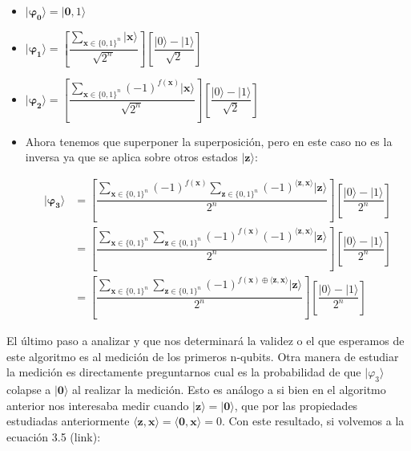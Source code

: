  \begin{itemize}
     \item $\mathbf{|\varphi_{0}\rangle} = |\mathbf{0},1\rangle$

    \vspace{5pt}

    \item  $\mathbf{|\varphi_{1}\rangle} = \left[ \dfrac{\sum_{\mathbf{x} \in \{0,1\}^{n}}|\mathbf{x}\rangle}{\sqrt{2^{n}}}\right] \left[ \dfrac{|0\rangle - |1\rangle}{\sqrt{2}}\right]$

    \vspace{5pt}

    \item $\mathbf{|\varphi_{2}\rangle} =\left[ \dfrac{\sum_{\mathbf{x} \in \{0,1\}^{n}}(-1)^{f(\mathbf{x})}|\mathbf{x}\rangle}{\sqrt{2^{n}}}\right] \left[ \dfrac{|0\rangle - |1\rangle}{\sqrt{2}}\right]$

    \vspace{5pt}

    \item Ahora tenemos que superponer la superposición, pero en este caso no es la inversa ya que se aplica sobre otros estados $|\mathbf{z}\rangle$:

    \begin{equation}
        \begin{split}\mathbf{|\varphi_{3}\rangle} &= \left[ \dfrac{\sum_{\mathbf{x} \in \{0,1\}^{n}}(-1)^{f(\mathbf{x})}\sum_{\mathbf{z} \in \{0,1\}^{n}}(-1)^{\langle\mathbf{z},\mathbf{x}\rangle}|\mathbf{z}\rangle}{2^{n}}\right] \left[ \dfrac{|0\rangle - |1\rangle}{2^{n}}\right] \\ &= \left[ \dfrac{\sum_{\mathbf{x} \in \{0,1\}^{n}}\sum_{\mathbf{z} \in \{0,1\}^{n}}(-1)^{f(\mathbf{x})}(-1)^{\langle\mathbf{z},\mathbf{x}\rangle}|\mathbf{z}\rangle}{2^{n}}\right] \left[ \dfrac{|0\rangle - |1\rangle}{2^{n}}\right] \\ &= \left[ \dfrac{\sum_{\mathbf{x} \in \{0,1\}^{n}}\sum_{\mathbf{z} \in \{0,1\}^{n}}(-1)^{f(\mathbf{x})\oplus\langle\mathbf{z},\mathbf{x}\rangle}|\mathbf{z}\rangle}{2^{n}}\right] \left[ \dfrac{|0\rangle - |1\rangle}{2^{n}}\right]
        \end{split}
    \end{equation}
 \end{itemize}

 El último paso a analizar y que nos determinará la validez o el que esperamos de este algoritmo es al medición de los primeros n-qubits. Otra manera de estudiar la medición es directamente preguntarnos cual es la probabilidad de que $|\varphi_{3}\rangle$ colapse a $|\mathbf{0}\rangle$ al realizar la medición. Esto es análogo a si bien en el algoritmo anterior nos interesaba medir cuando $|\mathbf{z}\rangle=|\mathbf{0}\rangle$, que por las propiedades estudiadas anteriormente $\langle\mathbf{z},\mathbf{x}\rangle=\langle\mathbf{0},\mathbf{x}\rangle=0$. Con este resultado, si volvemos a la ecuación 3.5 (link):

